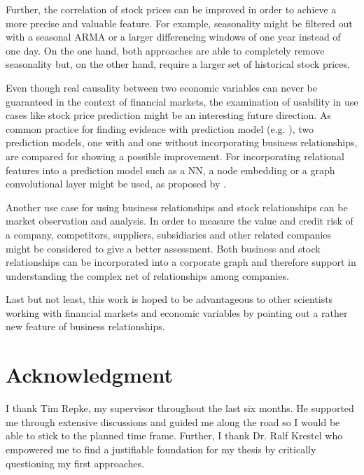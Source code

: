 
Further, the correlation of stock prices can be improved in order to achieve a more precise and valuable feature. For example, seasonality might be filtered out with a seasonal ARMA or a larger differencing windows of one year instead of one day. On the one hand, both approaches are able to completely remove seasonality but, on the other hand, require a larger set of historical stock prices.

Even though real causality between two economic variables can never be guaranteed in the context of financial markets, the examination of usability in use cases like stock price prediction might be an interesting future direction. As common practice for finding evidence with prediction model (e.g. \cite{Peng2016LeverageNetworks}), two prediction models, one with and one without incorporating business relationships, are compared for showing a possible improvement. For incorporating relational features into a prediction model such as a NN, a node embedding or a graph convolutional layer might be used, as proposed by \citet{Chen2018IncorporatingPrediction}.

Another use case for using business relationships and stock relationships can be market observation and analysis. In order to measure the value and credit risk of a company, competitors, suppliers, subsidiaries and other related companies might be considered to give a better assessment. Both business and stock relationships can be incorporated into a corporate graph and therefore support in understanding the complex net of relationships among companies.

Last but not least, this work is hoped to be advantageous to other scientists working with financial markets and economic variables by pointing out a rather new feature of business relationships.

\clearpage

\section*{Acknowledgment}

I thank Tim Repke, my supervisor throughout the last six months. He supported me through extensive discussions and guided me along the road so I would be able to stick to the planned time frame. Further, I thank Dr. Ralf Krestel who empowered me to find a justifiable foundation for my thesis by critically questioning my first approaches.

